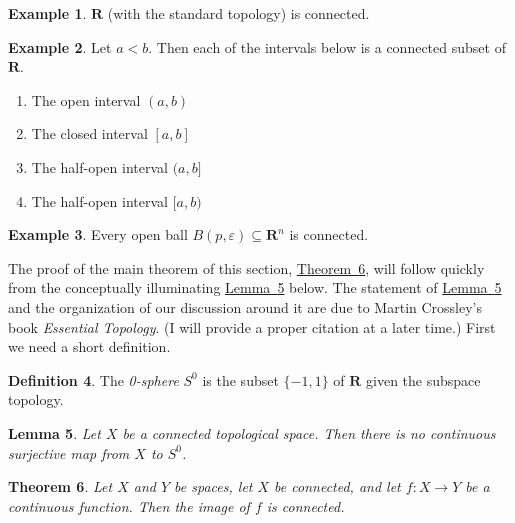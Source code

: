 \documentclass[10pt,]{article}
\theoremstyle{plain}
\newtheorem{theorem}{Theorem}[section]
\newtheorem{lemma}[theorem]{Lemma}
\theoremstyle{definition}
\newtheorem{definition}[theorem]{Definition}
\newtheorem{example}[theorem]{Example}
\newcommand{\RR}{\mathbf{R}}
\newcommand{\eps}{\varepsilon}
\newcommand{\lt}{ < }
\begin{document}
\begin{example}\label{t-conn-r-is-connected}
\(\RR\) (with the standard topology) is connected.%
\end{example}
\begin{example}\label{t-conn-intervals-are-connected}
Let \(a \lt b\). Then each of the intervals below is a connected subset of \(\RR\).%
\leavevmode%
\begin{enumerate}
\item\hypertarget{li-4}{}The open interval \((a, b)\)\item\hypertarget{li-5}{}The closed interval \([a, b]\)\item\hypertarget{li-6}{}The half-open interval \((a, b]\)\item\hypertarget{li-7}{}The half-open interval \([a, b)\)\end{enumerate}
\end{example}
\begin{example}\label{t-conn-euclidean-balls-are-connected}
Every open ball \(B(p, \eps) \subseteq \RR^n\) is connected.%
\end{example}
\par
The proof of the main theorem of this section, \hyperref[t-conn-continuous-image-of-connected]{Theorem~\ref{t-conn-continuous-image-of-connected}}, will follow quickly from the conceptually illuminating \hyperref[t-conn-no-surjective-map-into-0-sphere]{Lemma~\ref{t-conn-no-surjective-map-into-0-sphere}} below. The statement of \hyperref[t-conn-no-surjective-map-into-0-sphere]{Lemma~\ref{t-conn-no-surjective-map-into-0-sphere}} and the organization of our discussion around it are due to Martin Crossley's book \emph{Essential Topology}. (I will provide a proper citation at a later time.) First we need a short definition.%
\begin{definition}\label{t-conn-0-sphere}
The \emph{0-sphere} \(S^0\) is the subset \(\{-1, 1\}\) of \(\RR\) given the subspace topology.%
\end{definition}
\begin{lemma}\label{t-conn-no-surjective-map-into-0-sphere}
Let \(X\) be a connected topological space. Then there is no continuous surjective map from \(X\) to \(S^0\).%
\end{lemma}
\begin{theorem}\label{t-conn-continuous-image-of-connected}
Let \(X\) and \(Y\) be spaces, let \(X\) be connected, and let \(f \colon X \to Y\) be a continuous function. Then the image of \(f\) is connected.%
\end{theorem}
\par
%
\end{document}
